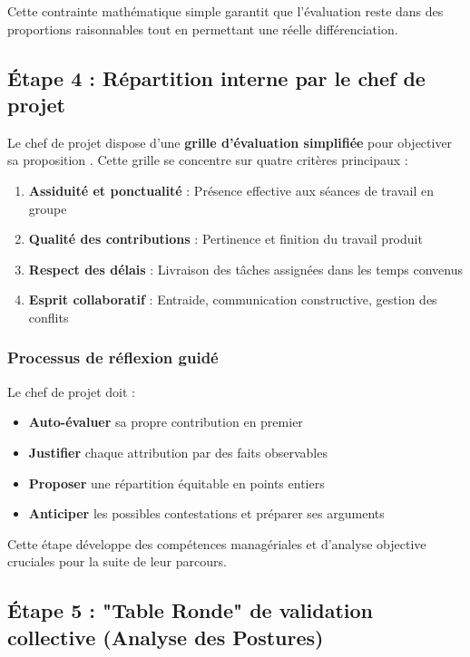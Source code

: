Cette contrainte mathématique simple garantit que l'évaluation reste dans des proportions raisonnables tout en permettant une réelle différenciation.

\subsection{Étape 4 : Répartition interne par le chef de projet}

Le chef de projet dispose d'une \textbf{grille d'évaluation simplifiée} pour objectiver sa proposition \parencite{evaluation_formative}. Cette grille se concentre sur quatre critères principaux :

\begin{enumerate}[leftmargin=*]
    \item \textbf{Assiduité et ponctualité} : Présence effective aux séances de travail en groupe
    \item \textbf{Qualité des contributions} : Pertinence et finition du travail produit
    \item \textbf{Respect des délais} : Livraison des tâches assignées dans les temps convenus
    \item \textbf{Esprit collaboratif} : Entraide, communication constructive, gestion des conflits
\end{enumerate}

\subsubsection{Processus de réflexion guidé}

Le chef de projet doit :
\begin{itemize}[leftmargin=*]
    \item \textbf{Auto-évaluer} sa propre contribution en premier
    \item \textbf{Justifier} chaque attribution par des faits observables
    \item \textbf{Proposer} une répartition équitable en points entiers
    \item \textbf{Anticiper} les possibles contestations et préparer ses arguments
\end{itemize}

Cette étape développe des compétences managériales et d'analyse objective cruciales pour la suite de leur parcours.

\subsection{Étape 5 : "Table Ronde" de validation collective (Analyse des Postures)}

